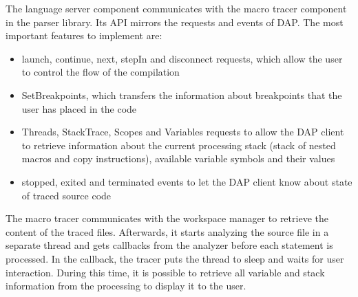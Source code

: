 The language server component communicates with the macro tracer component in the parser library. Its API mirrors the requests and events of DAP. The most important features to implement are:

\begin{itemize}
	\item launch, continue, next, stepIn and disconnect requests, which allow the user to control the flow of the compilation
	\item SetBreakpoints, which transfers the information about breakpoints that the user has placed in the code
	\item Threads, StackTrace, Scopes and Variables requests to allow the DAP client to retrieve information about the current processing stack (stack of nested macros and copy instructions), available variable symbols and their values
	\item stopped, exited and terminated events to let the DAP client know about state of traced source code
\end{itemize}

The macro tracer communicates with the workspace manager to retrieve the content of the traced files. Afterwards, it starts analyzing the source file in a separate thread and gets callbacks from the analyzer before each statement is processed. In the callback, the tracer puts the thread to sleep and waits for user interaction. During this time, it is possible to retrieve all variable and stack information from the processing to display it to the user.
